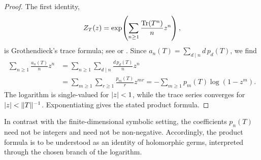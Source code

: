 \begin{proof}
  The first identity,
  \[
    Z_T(z)
    =\exp\!\left(\sum_{n\ge 1}\frac{\operatorname{Tr}(T^n)}{n}z^n\right),
  \]
  is Grothendieck's trace formula; see \cite{Grothendieck1956} or
  \cite[Chapter~3]{Simon2005TraceIdeals}. Since
  \(a_n(T)=\sum_{d\mid n}d\,p_d(T)\), we find
  \begin{align*}
    \sum_{n\ge 1}\frac{a_n(T)}{n}z^n
      &=\sum_{n\ge 1}\sum_{d\mid n}\frac{d\,p_d(T)}{n}z^n \\
      &=\sum_{m\ge 1}\sum_{r\ge 1}\frac{p_m(T)}{r}z^{mr}
       =-\sum_{m\ge 1}p_m(T)\log(1-z^m).
  \end{align*}
  The logarithm is single-valued for \(\lvert z \rvert<1\), while the trace
  series converges for \(\lvert z \rvert<\|T\|^{-1}\). Exponentiating gives the
  stated product formula.
\end{proof}

\begin{remark}
  \label{rem:witt-audit-constraints}
  In contrast with the finite-dimensional symbolic setting, the
  coefficients \(p_n(T)\) need not be integers and need not be
  non-negative. Accordingly, the product formula is to be understood as
  an identity of holomorphic germs, interpreted through the chosen branch
  of the logarithm.
\end{remark}
